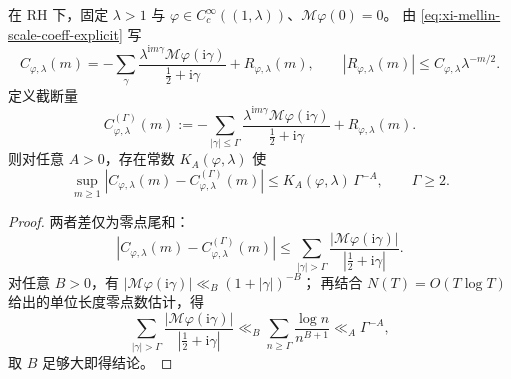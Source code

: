 \begin{theorem}[零点谱截断的统一超多项式误差界]\label{thm:xi-scale-spectral-truncation-uniform-superpoly}
在 RH 下，固定 \(\lambda>1\) 与 \(\varphi\in C_c^\infty((1,\lambda))\)、\(\mathcal M\varphi(0)=0\)。
由 \eqref{eq:xi-mellin-scale-coeff-explicit} 写
\[
C_{\varphi,\lambda}(m)
=-\sum_{\gamma}
\frac{\lambda^{\mathrm{i}m\gamma}\mathcal M\varphi(\mathrm{i}\gamma)}{\frac12+\mathrm{i}\gamma}
+R_{\varphi,\lambda}(m),
\qquad
\left|R_{\varphi,\lambda}(m)\right|\le C_{\varphi,\lambda}\lambda^{-m/2}.
\]
定义截断量
\[
C_{\varphi,\lambda}^{(\Gamma)}(m):=
-\sum_{|\gamma|\le\Gamma}
\frac{\lambda^{\mathrm{i}m\gamma}\mathcal M\varphi(\mathrm{i}\gamma)}{\frac12+\mathrm{i}\gamma}
+R_{\varphi,\lambda}(m).
\]
则对任意 \(A>0\)，存在常数 \(K_A(\varphi,\lambda)\) 使
\[
\sup_{m\ge 1}
\left|C_{\varphi,\lambda}(m)-C_{\varphi,\lambda}^{(\Gamma)}(m)\right|
\le
K_A(\varphi,\lambda)\,\Gamma^{-A},
\qquad \Gamma\ge 2.
\]
\end{theorem}
\begin{proof}
两者差仅为零点尾和：
\[
\left|C_{\varphi,\lambda}(m)-C_{\varphi,\lambda}^{(\Gamma)}(m)\right|
\le
\sum_{|\gamma|>\Gamma}
\frac{\left|\mathcal M\varphi(\mathrm{i}\gamma)\right|}{\left|\frac12+\mathrm{i}\gamma\right|}.
\]
对任意 \(B>0\)，有
\(\left|\mathcal M\varphi(\mathrm{i}\gamma)\right|\ll_B(1+|\gamma|)^{-B}\)；
再结合 \(N(T)=O(T\log T)\) 给出的单位长度零点数估计，得
\[
\sum_{|\gamma|>\Gamma}
\frac{\left|\mathcal M\varphi(\mathrm{i}\gamma)\right|}{\left|\frac12+\mathrm{i}\gamma\right|}
\ll_B
\sum_{n\ge \Gamma}\frac{\log n}{n^{B+1}}
\ll_A \Gamma^{-A},
\]
取 \(B\) 足够大即得结论。
\end{proof}

